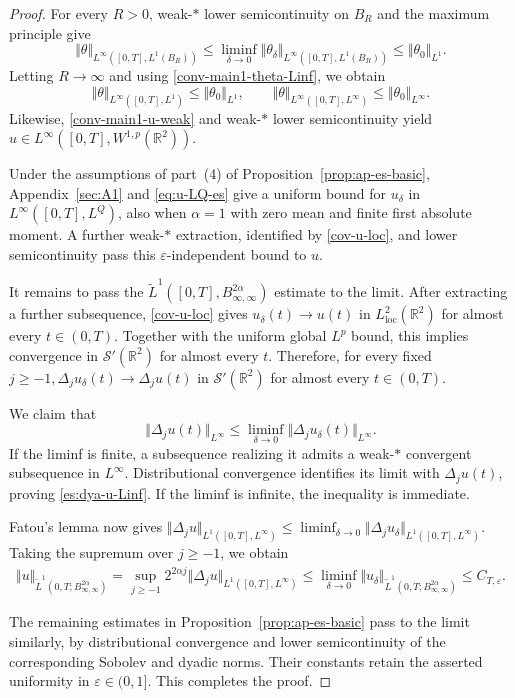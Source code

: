 \documentclass[reqno,11pt,a4paper]{amsart}
\begin{document}
\begin{proof}
For every $R>0$, weak-$\ast$ lower semicontinuity on $B_R$
and the maximum principle give
\[
  \Vert \theta\Vert _{L^\infty([0,T],L^1(B_R))}
  \leq
  \liminf_{\delta\to0}
  \Vert \theta_\delta\Vert _{L^\infty([0,T],L^1(B_R))}
  \leq\Vert \theta_0\Vert _{L^1}.
\]
Letting $R\to\infty$ and using
\eqref{conv-main1-theta-Linf}, we obtain
\[
  \Vert \theta\Vert _{L^\infty([0,T],L^1)}
  \leq\Vert \theta_0\Vert _{L^1},
  \qquad
  \Vert \theta\Vert _{L^\infty([0,T],L^\infty)}
  \leq\Vert \theta_0\Vert _{L^\infty}.
\]
Likewise, \eqref{conv-main1-u-weak} and weak-$\ast$ lower
semicontinuity yield
$u\in L^\infty([0,T],W^{1,p}(\mathbb R^2))$.

Under the assumptions of part~(4) of
Proposition~\ref{prop:ap-es-basic}, Appendix~\ref{sec:A1}
and \eqref{eq:u-LQ-es} give a uniform bound for
$u_\delta$ in $L^\infty([0,T],L^Q)$, also when $\alpha=1$
with zero mean and finite first absolute moment.
A further weak-$\ast$ extraction, identified by
\eqref{cov-u-loc}, and lower semicontinuity pass this
$\varepsilon$-independent bound to $u$.

It remains to pass the
$\widetilde L^1([0,T],B_{\infty,\infty}^{2\alpha})$ estimate
to the limit.
After extracting a further subsequence,
\eqref{cov-u-loc} gives $u_\delta(t)\rightarrow u(t)$ in  $L^2_{\mathrm{loc}}(\mathbb R^2)$ 
for almost every $t\in(0,T)$.
Together with the uniform global $L^p$ bound, this implies
convergence in $\mathcal S'(\mathbb R^2)$ for almost every $t$.
Therefore, for every fixed $j\geq-1, \Delta_j u_\delta(t)\longrightarrow\Delta_j u(t)$ in $\mathcal S'(\mathbb R^2)$
for almost every $t\in(0,T)$.

We claim that
\begin{equation}\label{es:dya-u-Linf}
  \Vert \Delta_j u(t)\Vert _{L^\infty}
  \leq
  \liminf_{\delta\to0}
  \Vert \Delta_j u_\delta(t)\Vert _{L^\infty}.
\end{equation}
If the liminf is finite, a subsequence realizing it admits
a weak-$\ast$ convergent subsequence in $L^\infty$.
Distributional convergence identifies its limit with
$\Delta_j u(t)$, proving \eqref{es:dya-u-Linf}.
If the liminf is infinite, the inequality is immediate.

Fatou's lemma now gives
$\Vert \Delta_j u\Vert _{L^1([0,T],L^\infty)} \leq
  \liminf_{\delta\to0}
  \Vert \Delta_j u_\delta\Vert _{L^1([0,T],L^\infty)}$.
Taking the supremum over $j\geq-1$, we obtain
\begin{align*}
  \Vert u\Vert _{\widetilde L^1
    (0,T;B_{\infty,\infty}^{2\alpha})}
  =
  \sup_{j\geq-1}
  2^{2\alpha j}
  \Vert \Delta_j u\Vert _{L^1([0,T],L^\infty)}
  \leq
  \liminf_{\delta\to0}
  \Vert u_\delta\Vert _{\widetilde L^1
    (0,T;B_{\infty,\infty}^{2\alpha})}
  \leq C_{T,\varepsilon}.
\end{align*}

The remaining estimates in
Proposition~\ref{prop:ap-es-basic} pass to the limit similarly,
by distributional convergence and lower semicontinuity
of the corresponding Sobolev and dyadic norms.
Their constants retain the asserted uniformity in
$\varepsilon\in(0,1]$.
This completes the proof.
\end{proof}
\end{document}
